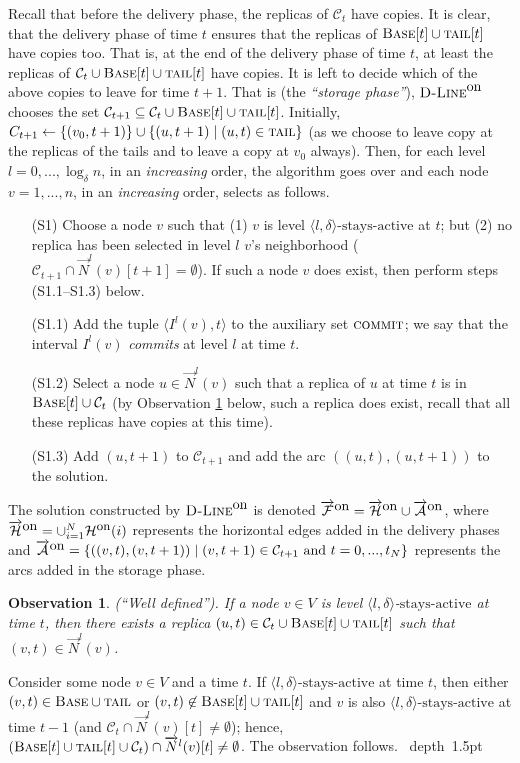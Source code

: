 \documentclass[11pt]{article}
\newtheorem{observation}[theorem]{Observation}
\def\proof{\par\noindent{\bf Proof:~}}
\def\blackslug{\hbox{\hskip 1pt \vrule width 4pt height 8pt
    depth 1.5pt \hskip 1pt}}
\def\QED{\quad\blackslug\lower 8.5pt\null\par}
\newcommand{\rot}[0]{v_0}
\newcommand{\neigh}[0]{N}
\newcommand{\stayactive}[0]{\mbox{stays-active}}
\newcommand{\calH}{\mathcal{H}}
\newcommand{\calA}{\mathcal{A}}
\newcommand{\calF}{\mathcal{F}}
\newcommand{\calC}{\mathcal{C}}
\newcommand{\DBase}[0]{{\mbox{\sc Base}}}
\newcommand{\rep}[2]{(#1,#2)}
\newcommand{\NN}{N}
\newcommand{\nn}{n}
\newcommand{\Dlineon}[0]{\mbox{{\sc D-Line}}^{\mbox{\upshape on}}}
\newcommand{\NID}[2]{\overrightarrow{\neigh}^{#1}(#2)}
\newcommand{\DPHon}[0]{\calH^{\mbox{\upshape\small on}}}
\newcommand{\tail}[0]{\mbox{\sc tail}}
\newcommand{\ADon}[0]{\overrightarrow{\calA}^{\mbox{\upshape on}}}
\newcommand{\HDon}[0]{\overrightarrow{\calH}^{\mbox{\upshape on}}}
\newcommand{\FDon}[0]{\overrightarrow{\calF}^{\mbox{\upshape on}}}
\newcommand{\DCOMMIT}[0]{\mbox{\sc commit}}
\begin{document}
Recall that before the delivery phase, the replicas of $\calC_{t}$ have copies.
It is clear, that the delivery phase of time $t$ ensures that the replicas of $\DBase[t]\cup\tail[t]$ have copies too.
That is, at the end of the delivery phase of time $t$, at least the replicas of $\calC_{t}\cup\DBase[t]\cup\tail[t]$ have copies.
It is left to decide which of the above copies to leave for time $t+1$.
That is (the {\em ``storage phase''}),
$\Dlineon$ chooses the set
$\calC_{t+1}\subseteq \calC_{t}\cup\DBase[t]\cup\tail[t]$.
Initially, $C_{t+1}\leftarrow\{\rep{\rot}{t+1}\}\cup\{(u,t+1)\mid (u,t)\in\tail\}$ (as we choose to leave copy at the replicas of the tails and to leave a copy at $\rot$ always).
Then, for each level $l=0,...,\log_\delta n$, in an {\em increasing} order, the algorithm goes over and
each node $v=1,...,\nn$, in an {\em increasing} order, selects as follows.
\begin{itemize}
\item[(S1)] Choose a node $v$ such that
(1) $v$ is level $\langle l,\delta\rangle$-$\stayactive$ at $t$; but
(2) no replica has been selected in level $l$ $v$'s neighborhood ($\calC_{t+1}\cap\NID{l}{v}[t+1]=\emptyset$).
If such a node $v$ does exist, then perform steps (S1.1--S1.3) below.

\item[(S1.1)] Add the tuple $\langle I^l(v),t\rangle$ to the auxiliary set $\DCOMMIT$;
we say that the interval $I^l(v)$ {\em commits} at level $l$ at time $t$.

\item[(S1.2)]
Select a node $u\in\NID{l}{v}$ such that a replica of $u$ at time $t$ is in
$\DBase[t]\cup \calC_{t}$ (by Observation \ref{obser:Dlinoon: well defined} below, such a replica does exist,
recall that all these replicas have copies at this time).
\item[(S1.3)] Add  $\rep{u}{t+1}$ to $\calC_{t+1}$ and add the arc $(\rep{u}{t},\rep{u}{t+1})$ to the solution.

\end{itemize}

The solution constructed by $\Dlineon$ is denoted $\FDon=\HDon\cup\ADon$, where
$\HDon=\cup_{i=1}^{\NN}\DPHon(i)$
represents the horizontal edges added in the delivery phases and
$\ADon=\{(\rep{v}{t},\rep{v}{t+1})\mid \rep{v}{t+1}\in\calC_{t+1} \mbox{ and } t=0,...,t_\NN\}$
represents the arcs added in the storage phase.


\begin{observation}
{\sc (``Well defined'').}
If a node $v\in V$ is level $\langle l,\delta\rangle$-$\stayactive$ at time $t$,
then there exists a replica $\rep{u}{t}\in \calC_{t}\cup\DBase[t]\cup\tail[t]$ such that $(v,t)\in\NID{l}{v}$. \label{obser:Dlinoon: well defined}
\end{observation}
\def\AppDlineonObserWellDefined{
\proof
Consider some node $v\in V$ and a time $t$. If $\langle l,\delta\rangle$-$\stayactive$ at time $t$,
then either
$(v,t)\in\DBase\cup\tail$ or $(v,t)\not\in\DBase[t]\cup\tail[t]$ and
$v$ is also $\langle l,\delta\rangle$-$\stayactive$ at time $t-1$ (and
$\calC_{t}\cap
\NID{l}{v}[t]\not=\emptyset$);
hence, $(\DBase[t]\cup\tail[t]\cup \calC_{t})\cap \NID{l}{v}[t]\not=\emptyset$.
The observation follows.
\QED
} \AppDlineonObserWellDefined
\end{document}

